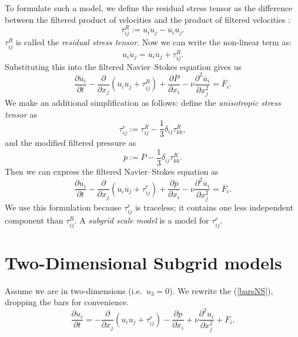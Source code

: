 \documentclass[11pt,a4paper]{article}
\newcommand{\eq}[1]{(\ref{#1})}
\begin{document}
To formulate such a model, we define the residual stress tensor as the difference between the filtered product of velocities and the product of filtered velocities \cite{Pope2000}:
$$\tau_{ij}^R := \overline{u_iu_j} - \overline{u}_i\overline{u}_j.$$
$\tau_{ij}^R$ is called the \emph{residual stress tensor}. Now we can write the non-linear term as:
$$\overline{u_iu_j} = \overline{u}_i\overline{u}_j+\tau_{ij}^R.$$
Substituting this into the filtered Navier--Stokes equation gives us
$$\frac{\partial \overline{u}_i}{\partial t} - \frac{\partial }{\partial x_j}\left(\overline{u}_i\overline{u}_j+\tau_{ij}^R \right)+\frac{\partial \overline{P}}{\partial x_i}- \nu \frac{\partial^2\overline{u}_i}{\partial x_j^2} = \overline{F}_i.$$
We make an additional simplification as follows: define the \emph{anisotropic stress tensor} as
$$\tau_{ij}^r := \tau_{ij}^R - \frac{1}{3}\delta_{ij}\tau_{kk}^R,$$
and the modified filtered pressure as
$$\overline{p} := \overline{P} - \frac{1}{3}\delta_{ij}\tau_{kk}^R.$$
Then we can express the filtered Navier--Stokes equation as
\begin{equation}\label{barsNS}
\frac{\partial \overline{u}_i}{\partial t} - \frac{\partial }{\partial x_j}\left(\overline{u}_i\overline{u}_j+\tau_{ij}^r \right)+\frac{\partial \overline{p}}{\partial x_i}- \nu \frac{\partial^2\overline{u}_i}{\partial x_j^2} = \overline{F}_i.
\end{equation}
We use this formulation because $\tau_{ij}^r$ is traceless; it contains one less independent component than $\tau_{ij}^R$. A \emph{subgrid scale model} is a model for $\tau_{ij}^r$.
\section{Two-Dimensional Subgrid models}
Assume we are in two-dimensions (i.e.\ $u_3=0$). We rewrite the \eq{barsNS}, dropping the bars for convenience.
\begin{equation}\label{filteredNS}
\frac{\partial {u}_i}{\partial t} =- \frac{\partial }{\partial x_j}\left({u}_i{u}_j +\tau_{ij}^r\right)-\frac{\partial {p}}{\partial x_i}+ \nu \frac{\partial^2u_i}{\partial x_j^2} + {F}_i.
\end{equation}
\end{document}
